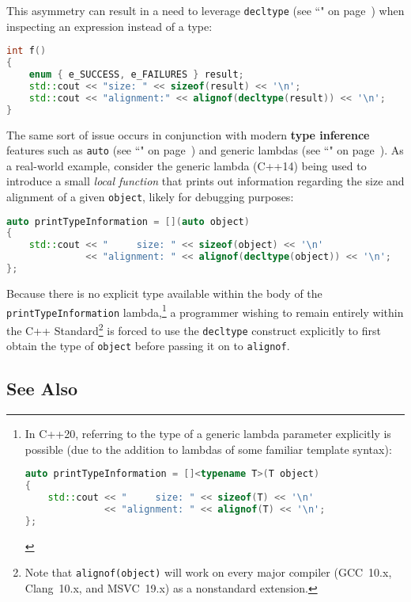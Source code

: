 \noindent This asymmetry can result in a need to leverage
\texttt{decltype} (see ``" on page~\pageref{decltype}) when inspecting an expression instead
of a type:

\begin{lstlisting}[language=C++]
int f()
{
    enum { e_SUCCESS, e_FAILURES } result;
    std::cout << "size: " << sizeof(result) << '\n';
    std::cout << "alignment:" << alignof(decltype(result)) << '\n';
}
\end{lstlisting}

\noindent The same sort of issue occurs in conjunction with modern \textbf{type
inference} features such as \texttt{auto} (see ``" on page~\pageref{auto-feature}) and
generic lambdas (see ``" on page~\pageref{genericlambda}). As a real-world example, consider the
generic lambda (C++14) being used to introduce a small
\emph{local function} that prints out information regarding the size and
alignment of a given \texttt{object}, likely for debugging purposes:

\begin{lstlisting}[language=C++]
auto printTypeInformation = [](auto object)
{
    std::cout << "     size: " << sizeof(object) << '\n'
              << "alignment: " << alignof(decltype(object)) << '\n';
};
\end{lstlisting}

\noindent Because there is no explicit type available within the body of the
\texttt{printTypeInformation} lambda,{\cprotect\footnote{In C++20, referring to the type of a generic lambda parameter explicitly is possible (due to the addition to lambdas of some familiar template syntax):

\begin{lstlisting}[language=C++, basicstyle={\ttfamily\footnotesize}]
auto printTypeInformation = []<typename T>(T object)
{
    std::cout << "     size: " << sizeof(T) << '\n'
              << "alignment: " << alignof(T) << '\n';
};
\end{lstlisting}
      }} a programmer wishing to remain entirely within the C++
Standard{\cprotect\footnote{Note that \texttt{alignof(object)} will work
on every major compiler (GCC~10.x, Clang~10.x, and MSVC~19.x) as a
  nonstandard extension.}} is forced to use the
\texttt{decltype} construct explicitly to first obtain
the type of \texttt{object} before passing it on to \texttt{alignof}.

\subsection[See Also]{See Also}\label{see-also}

